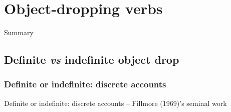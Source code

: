 \setchapterpreamble[u]{\margintoc}
\chapter{Object-dropping verbs}

Summary


\section{Definite \textit{vs} indefinite object drop} 

\subsection{Definite or indefinite: discrete accounts} 

Definite or indefinite: discrete accounts -- Fillmore (1969)’s seminal work





